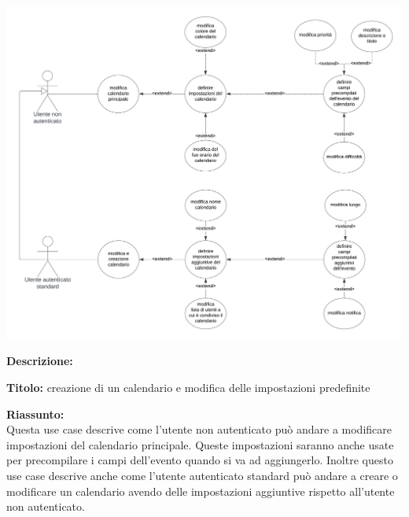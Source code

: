 \begin{listaPersonale}[UC]{}
    \newpage


    \begin{center}
        \includegraphics[width=1\textwidth]{img/Diagrammi/UseCases/ImpostazioniPredefiniteCalendario.png}
    \end{center}

    \textbf{Descrizione:}

    \textbf{Titolo:} creazione di un calendario e modifica delle impostazioni predefinite

    \textbf{Riassunto:} \\
    Questa use case descrive come l'utente non autenticato può andare a modificare impostazioni del calendario principale. Queste impostazioni saranno anche usate per precompilare i campi dell'evento quando si va ad aggiungerlo. Inoltre questo use case descrive anche come l'utente autenticato standard può andare a creare o modificare un calendario avendo delle impostazioni aggiuntive rispetto all'utente non autenticato.


\end{listaPersonale}
